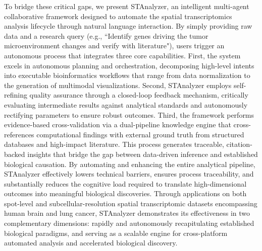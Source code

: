 \documentclass[a4,center,fleqn]{NAR}
\begin{document}
To bridge these critical gaps, we present STAnalyzer, an intelligent multi-agent collaborative framework designed to automate the spatial transcriptomics analysis lifecycle through natural language interaction. By simply providing raw data and a research query (e.g., ``Identify genes driving the tumor microenvironment changes and verify with literature"), users trigger an autonomous process that integrates three core capabilities. First, the system excels in autonomous planning and orchestration, decomposing high-level intents into executable bioinformatics workflows that range from data normalization to the generation of multimodal visualizations. Second, STAnalyzer employs self-refining quality assurance through a closed-loop feedback mechanism, critically evaluating intermediate results against analytical standards and autonomously rectifying parameters to ensure robust outcomes. Third, the framework performs evidence-based cross-validation via a dual-pipeline knowledge engine that cross-references computational findings with external ground truth from structured databases and high-impact literature. This process generates traceable, citation-backed insights that bridge the gap between data-driven inference and established biological causation. By automating and enhancing the entire analytical pipeline, STAnalyzer effectively lowers technical barriers, ensures process traceability, and substantially reduces the cognitive load required to translate high-dimensional outcomes into meaningful biological discoveries. Through applications on both spot-level and subcellular-resolution spatial transcriptomic datasets encompassing human brain and lung cancer, STAnalyzer demonstrates its effectiveness in two complementary dimensions: rapidly and autonomously recapitulating established biological paradigms, and serving as a scalable engine for cross-platform automated analysis and accelerated biological discovery.

\end{document}
